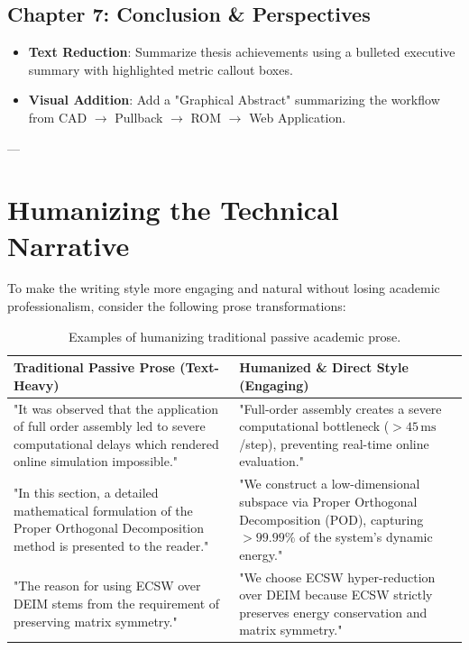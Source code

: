 \documentclass[12pt,a4paper]{article}
\begin{document}
\subsection{Chapter 7: Conclusion \& Perspectives}
\begin{itemize}[leftmargin=*]
    \item \textbf{Text Reduction}: Summarize thesis achievements using a bulleted executive summary with highlighted metric callout boxes.
    \item \textbf{Visual Addition}: Add a "Graphical Abstract" summarizing the workflow from CAD $\to$ Pullback $\to$ ROM $\to$ Web Application.
\end{itemize}

---

\section{Humanizing the Technical Narrative}

To make the writing style more engaging and natural without losing academic professionalism, consider the following prose transformations:

\begin{table}[htbp]
    \centering
    \caption{Examples of humanizing traditional passive academic prose.}
    \label{tab:prose_humanization}
    \begin{tabular}{p{7.5cm} p{7.5cm}}
        \toprule
        \textbf{Traditional Passive Prose (Text-Heavy)} & \textbf{Humanized \& Direct Style (Engaging)} \\
        \midrule
        "It was observed that the application of full order assembly led to severe computational delays which rendered online simulation impossible." & "Full-order assembly creates a severe computational bottleneck ($>45\,\text{ms}$/step), preventing real-time online evaluation." \\
        \midrule
        "In this section, a detailed mathematical formulation of the Proper Orthogonal Decomposition method is presented to the reader." & "We construct a low-dimensional subspace via Proper Orthogonal Decomposition (POD), capturing $>99.99\%$ of the system's dynamic energy." \\
        \midrule
        "The reason for using ECSW over DEIM stems from the requirement of preserving matrix symmetry." & "We choose ECSW hyper-reduction over DEIM because ECSW strictly preserves energy conservation and matrix symmetry." \\
        \bottomrule
    \end{tabular}
\end{table}
\end{document}

